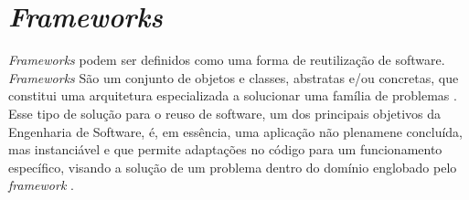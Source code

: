 \section{\textit{Frameworks}}
\textit{Frameworks} podem ser definidos como uma forma de reutilização de software. \textit{Frameworks} São um conjunto de objetos e classes, abstratas e/ou concretas, que constitui uma arquitetura especializada a solucionar uma família de problemas \cite{barretoJunior2006}. Esse tipo de solução para o reuso de software, um dos principais objetivos da Engenharia de Software, é, em essência, uma aplicação não plenamene concluída, mas instanciável e que permite adaptações no código para um funcionamento específico, visando a solução de um problema dentro do domínio englobado pelo \textit{framework} \cite{barretoJunior2006}.

